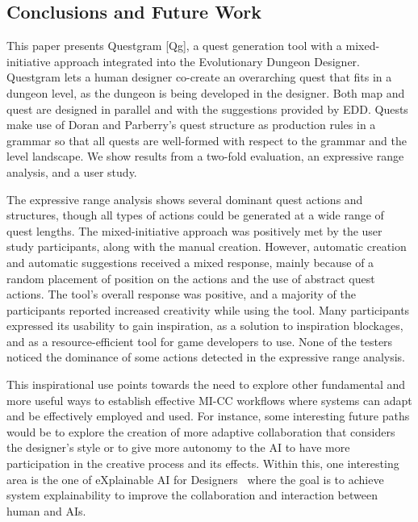 \subsection{Conclusions and Future Work}

This paper presents Questgram [Qg], a quest generation tool with a mixed-initiative approach integrated into the Evolutionary Dungeon Designer. Questgram lets a human designer co-create an overarching quest that fits in a dungeon level, as the dungeon is being developed in the designer. Both map and quest are designed in parallel and with the suggestions provided by EDD. Quests make use of Doran and Parberry's quest structure as production rules in a grammar so that all quests are well-formed with respect to the grammar and the level landscape. We show results from a two-fold evaluation, an expressive range analysis, and a user study. 

The expressive range analysis shows several dominant quest actions and structures, though all types of actions could be generated at a wide range of quest lengths. The mixed-initiative approach was positively met by the user study participants, along with the manual creation. However, automatic creation and automatic suggestions received a mixed response, mainly because of a random placement of position on the actions and the use of abstract quest actions. The tool's overall response was positive, and a majority of the participants reported increased creativity while using the tool. Many participants expressed its usability to gain inspiration, as a solution to inspiration blockages, and as a resource-efficient tool for game developers to use. None of the testers noticed the dominance of some actions detected in the expressive range analysis.

This inspirational use points towards the need to explore other fundamental and more useful ways to establish effective MI-CC workflows where systems can adapt and be effectively employed and used. For instance, some interesting future paths would be to explore the creation of more adaptive collaboration that considers the designer's style or to give more autonomy to the AI to have more participation in the creative process and its effects. Within this, one interesting area is the one of eXplainable AI for Designers~\cite{p8Zhu2018-XAIDesignersMICC} where the goal is to achieve system explainability to improve the collaboration and interaction between human and AIs.



